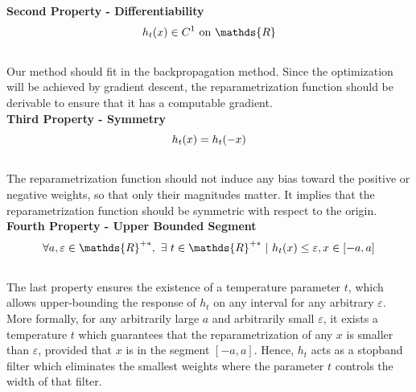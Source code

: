 \noindent\textbf{Second Property - Differentiability} \\
\begin{equation}
    \centering
    h_t(x) \in C^1 \text{ on } \mathds{R}
    \label{eqn:chap1:reparam_prop2}
\end{equation}
\\
Our method should fit in the backpropagation method. Since the optimization will
be achieved by gradient descent, the reparametrization function should be
derivable to ensure that it has a computable gradient.\\

\noindent\textbf{Third Property - Symmetry} \\

\begin{equation}
    \centering
    h_t(x) = h_t(-x)
    \label{eqn:chap1:reparam_prop3}
\end{equation}
\\
The reparametrization function should not induce any bias toward the positive or
negative weights, so that only their magnitudes matter. It implies that the
reparametrization function should be symmetric with respect to the origin.\\


\noindent\textbf{Fourth Property - Upper Bounded Segment} \\

\begin{equation}
    \centering
    \forall a,\varepsilon \in\mathds{R}^{+\ast},~ \exists ~t
    \in\mathds{R}^{+\ast} ~ | ~ h_t(x) \leq \varepsilon, x \in [-a,a]
    \label{eqn:chap1:reparam_prop4}
\end{equation}
\\
The last property ensures the existence of a temperature parameter $t$, which
allows upper-bounding the response of $h_t$ on any interval for any arbitrary
$\varepsilon$. More formally, for any arbitrarily large $a$ and arbitrarily
small $\varepsilon$, it exists a temperature $t$ which guarantees that the
reparametrization of any $x$ is smaller than $\varepsilon$, provided that $x$ is
in the segment $[-a, a]$. Hence, $h_t$ acts as a stopband filter which
eliminates the smallest weights where the parameter $t$ controls the width of
that filter. \\




